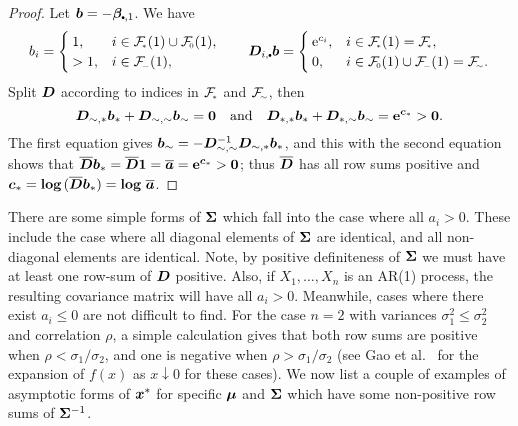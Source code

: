 \begin{proof}
Let $\bfb = -\bfbeta_{\sbullet,1}$. We have
\[
	b_i = \begin{cases}
		1, & i \in \Fset{*}(1) \cup \Fset{0}(1), \\
		>1, & i \in \Fset{-}(1),
	\end{cases}
	\qquad
	\bfD_{i,\sbullet} \bfb = \begin{cases}
		\e^{c_i}, & i \in \Fset{*}(1) = \Fset{*}, \\
		0, & i \in \Fset{0}(1) \cup \Fset{-}(1) = \Fset{\sim}.
	\end{cases}
\]
Split $\bm{D}$ according to indices in $\Fset{*}$ and $\Fset{\sim}$, then
%
\[ \bm{D}_{{\sim},{*}} \bm{b}_{*} + \bm{D}_{{\sim},{\sim}} \bm{b}_{\sim} = \bm{0}
\quad \text{and}
 \quad \bm{D}_{{*},{*}} \bm{b}_{*} + \bm{D}_{{*},{\sim}} \bm{b}_{\sim}  =
 \text{\bf{e}}^{\bm{c}_{*}}  > \bm{0}. \]
%
The first equation gives $\bm{b}_{{\sim}} =  - \bm{D}_{{\sim},{\sim}}^{-1}
\bm{D}_{{\sim},{*}} \bm{b}_{*}$, and this with the second equation shows
that
$ \overline{\bm{D}} \bm{b}_{*} = \overline{\bm{D}} \bm{1} = \overline{\bm{a}} =
\text{\bf{e}}^{\bm{c}_{*}} > \bm{0} $;
thus $\overline{\bm{D}}$ has all row sums positive and
$\bm{c}_{*} = \text{\bf{log}}\,(\overline{\bm{D}}\bm{b}_{*}) = \text{\bf{log}}\,\,\overline{\bm{a}}$.
\end{proof}

There are some simple forms of $\bm{\Sigma}$ which fall into the case where all
$a_i > 0$. These include the case where all diagonal elements of $\bm{\Sigma}$
are identical, and all non-diagonal elements are identical. Note, by positive
definiteness of $\bm{\Sigma}$ we must have at least one row-sum of $\bm{D}$ positive. Also,
if $X_1, \dots, X_n$ is an AR(1) process, the resulting covariance matrix
will have all $a_i > 0$. Meanwhile, cases where there exist  $a_i \leq 0$ are
not difficult to find. For the case $n=2$ with variances $\sigma_1^2 \leq
\sigma_2^2$ and correlation $\rho$, a simple calculation gives that both row
sums are positive when $\rho < \sigma_1 / \sigma_2$, and one is negative when
$\rho > \sigma_1 / \sigma_2$ (see Gao et al.\ \cite{gao2009asymptotic} for the
expansion of $f(x)$ as $x \downarrow 0$ for these cases). We now list a couple
of examples of asymptotic forms of $\bm{x}^*$ for specific $\bm{\mu}$ and
$\bm{\Sigma}$ which have some non-positive row sums of $\bm{\Sigma}^{-1}$.

